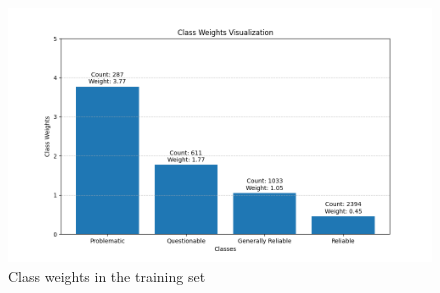 \begin{figure}[htbp]
    \centering
    \includegraphics[width=0.8\linewidth]{figures/class_weights.png}
    \caption{Class weights in the training set}
    \label{fig:class_weights}
\end{figure}



